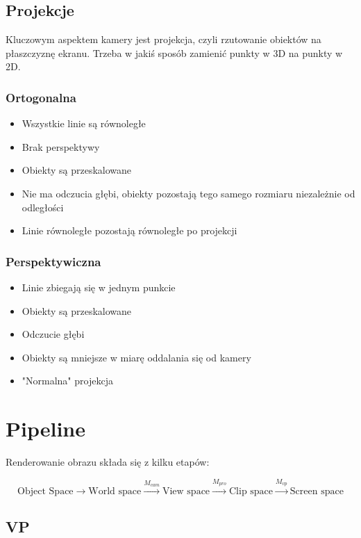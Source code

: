 \documentclass{../notatki}
\begin{document}
\subsection{Projekcje}

Kluczowym aspektem kamery jest projekcja, czyli rzutowanie obiektów
na płaszczyznę ekranu.
Trzeba w jakiś sposób zamienić punkty w 3D na punkty w 2D.

\subsubsection{Ortogonalna}

\begin{itemize}
  \item Wszystkie linie są równoległe
  \item Brak perspektywy
  \item Obiekty są przeskalowane
  \item Nie ma odczucia głębi, obiekty pozostają tego samego rozmiaru
    niezależnie od odległości
  \item Linie równoległe pozostają równoległe po projekcji
\end{itemize}

\subsubsection{Perspektywiczna}

\begin{itemize}
  \item Linie zbiegają się w jednym punkcie
  \item Obiekty są przeskalowane
  \item Odczucie głębi
  \item Obiekty są mniejsze w miarę oddalania się od kamery
  \item "Normalna" projekcja
\end{itemize}

\section{Pipeline}

Renderowanie obrazu składa się z kilku etapów:

$$
\text{Object Space} \rightarrow \text{World space}
\overset{M_{cam}}{\rightarrow} \text{View space}
\overset{M_{pro}}{\rightarrow} \text{Clip space}
\overset{M_{vp}}{\rightarrow} \text{Screen space}
$$

\subsection{VP}
\end{document}
